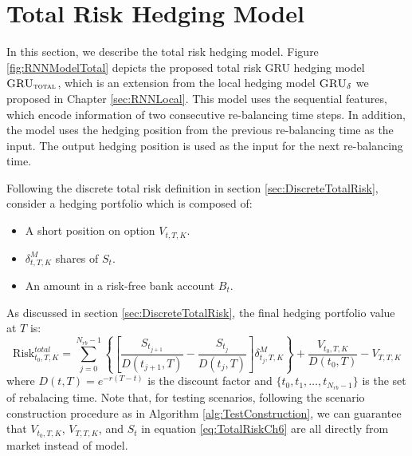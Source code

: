 \documentclass[letterpaper,12pt,titlepage,oneside,final]{book}
\numberwithin{equation}{section}
\theoremstyle{definition}
\newcommand{\model}{\textsc{GRU}_\delta}
\newcommand{\modelT}{\textsc{GRU}_{\textsc{total}}}
\newcommand{\DT}{\Delta t}
\newcommand{\Vmkt}{V^{mkt}}
\newcommand{\Smkt}{S}
\begin{document}
\section{Total Risk Hedging Model}
\label{sec:TotalModelDes}
In this section, we describe the total risk hedging model.
Figure \ref{fig:RNNModelTotal} depicts the proposed total risk GRU  hedging  model $\modelT$,
which is an extension from the local hedging model $\model$ we proposed in Chapter \ref{sec:RNNLocal}.
This model uses the sequential features, which encode information of two consecutive re-balancing time steps. In addition, the model uses the hedging position from the previous re-balancing time as the input. The output hedging position is used as the input for the next re-balancing time.






Following the discrete total risk definition in section \ref{sec:DiscreteTotalRisk}, consider a hedging portfolio  which is composed of:
\begin{itemize}
	\item A short position on option $V_{t,T,K}$.
	\item $\delta^{M}_{t,T,K}$ shares of $\Smkt_t$. 
	\item An amount in a risk-free bank account $B_t$.
\end{itemize}
 As discussed in section \ref{sec:DiscreteTotalRisk}, the final hedging portfolio value at $T$ is:
 \begin{equation}
	\text{Risk}^{total}_{t_0,T,K}=\sum_{j=0}^{N_{rb}-1}\left\{ \left[\frac{\Smkt_{t_{j+1}}}{D(t_{j+1},T)}-\frac{\Smkt_{t_{j}}}{D(t_{j},T)}\right] \delta^M_{t_j,T,K} \right\}+\frac{V_{t_0,T,K}}{D(t_{0},T)}-V_{T,T,K}
	\label{eq:TotalRiskCh6}
\end{equation}
where
$D(t,T)=e^{-r(T-t)}$ is the discount factor and $\{t_0,t_1, \dots, t_{N_{rb}-1}\}$ is the set of rebalacing time. Note that, for testing scenarios, following the scenario construction procedure as in Algorithm \ref{alg:TestConstruction}, we can guarantee that $V_{t_0,T,K}$, $V_{T,T,K}$, and $\Smkt_t$ in equation \eqref{eq:TotalRiskCh6} are all directly from market instead of model.
\end{document}
